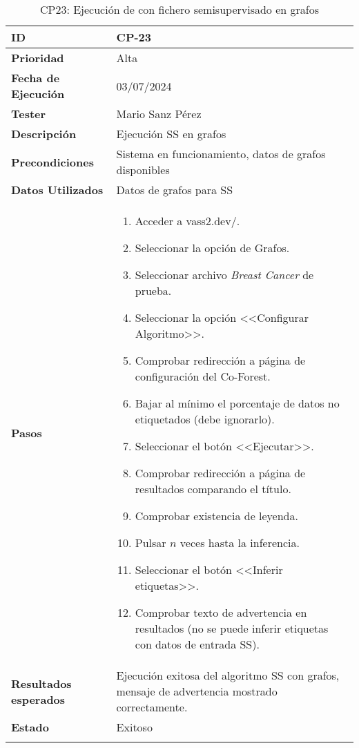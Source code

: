 \begin{longtable}{>{\raggedright\arraybackslash}p{4cm} p{9.5cm}}
    \hline
    \rowcolor{gray!20}
    \textbf{ID} & CP-23\\
    \hline
    \rowcolor{white}
    \textbf{Prioridad} & Alta \\
    \hline
    \rowcolor{gray!20}
    \textbf{Fecha de Ejecución} & 03/07/2024 \\
    \hline
    \rowcolor{white}
    \textbf{Tester} & Mario Sanz Pérez \\
    \hline
    \rowcolor{gray!20}
    \textbf{Descripción} & Ejecución SS en grafos\\
    \hline
    \rowcolor{white}
    \textbf{Precondiciones} & Sistema en funcionamiento, datos de grafos disponibles\\
    \hline
    \rowcolor{white}
    \textbf{Datos Utilizados} & Datos de grafos para SS\\
    \hline
    \rowcolor{gray!20}
    \textbf{Pasos} & \begin{enumerate}
		\item Acceder a vass2.dev/.
        \item Seleccionar la opción de Grafos.
        \item Seleccionar archivo \textit{Breast Cancer} de prueba.
        \item Seleccionar la opción <<Configurar Algoritmo>>.
        \item Comprobar redirección a página de configuración del Co-Forest.
        \item Bajar al mínimo el porcentaje de datos no etiquetados (debe ignorarlo).
        \item Seleccionar el botón <<Ejecutar>>.
        \item Comprobar redirección a página de resultados comparando el título.
        \item Comprobar existencia de leyenda.
        \item Pulsar $n$ veces hasta la inferencia.
        \item Seleccionar el botón <<Inferir etiquetas>>.
        \item Comprobar texto de advertencia en resultados (no se puede inferir etiquetas con datos de entrada SS).
    \end{enumerate}\\
	\hline
    \rowcolor{gray!20}
    \textbf{Resultados esperados} & Ejecución exitosa del algoritmo SS con grafos, mensaje de advertencia mostrado correctamente.\\
    \hline
    \rowcolor{white}
    \textbf{Estado} & Exitoso\\
    \hline
	\caption[CP23: Ejecución SS en grafos]{CP23: Ejecución de con fichero semisupervisado en grafos}
\end{longtable}

